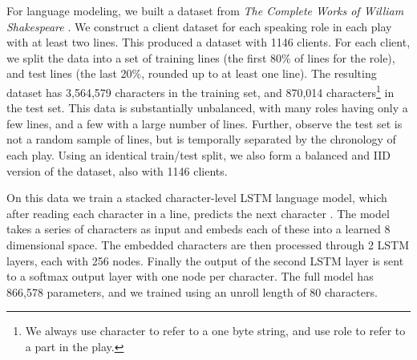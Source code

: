 \documentclass[twoside]{article}
\begin{document}
For language modeling, we built a dataset from \emph{The Complete
  Works of William Shakespeare} \citep{shakespeare}. We construct a
client dataset for each speaking role in each play with at least two
lines. This produced a dataset with 1146 clients. For each client, we
split the data into a set of training lines (the first 80\% of lines
for the role), and test lines (the last 20\%, rounded up to at least
one line). The resulting dataset has 3,564,579 characters in the
training set, and 870,014 characters\footnote{We always use character
  to refer to a one byte string, and use role to refer to a part in
  the play.}  in the test set. This data is substantially unbalanced,
with many roles having only a few lines, and a few with a large number
of lines.
Further, observe the test set is not a random sample of lines, but is
temporally separated by the chronology of each play. Using an
identical train/test split, we also form a balanced and IID version of
the dataset, also with 1146 clients.

On this data we train a stacked character-level LSTM language model,
which after reading each character in a line, predicts the next
character \citep{kim15character}.  The model takes a series of
characters as input and embeds each of these into a learned 8
dimensional space. The embedded characters are then processed through
2 LSTM layers, each with 256 nodes. Finally the output of the second
LSTM layer is sent to a softmax output layer with one node per
character. The full model has 866,578 parameters, and we trained using
an unroll length of 80 characters.
\end{document}
